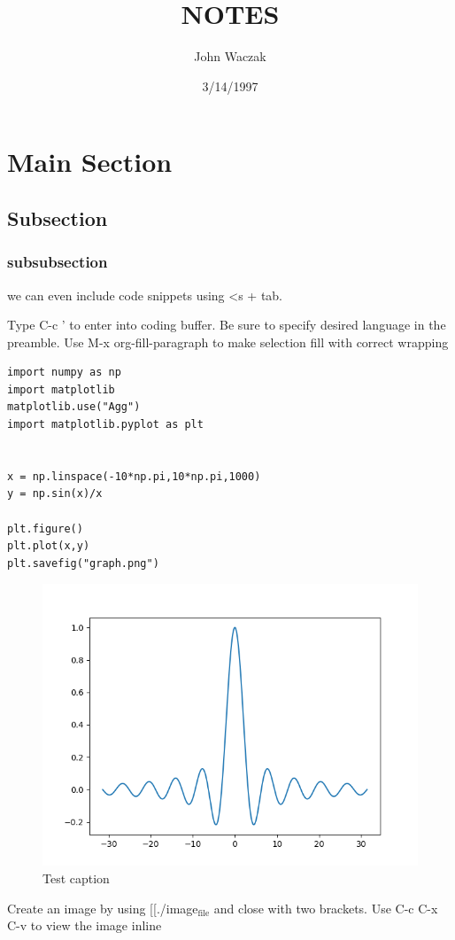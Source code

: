 \documentclass[11pt]{article}
\author{John Waczak}
\date{3/14/1997}
\title{NOTES}
\begin{document}
\maketitle

\section{Main Section}
\label{sec-1}

\subsection{Subsection}
\label{sec-1-1}

\subsubsection{subsubsection}
\label{sec-1-1-1}
we can even include code snippets using <s + tab.

Type C-c ' to enter into coding buffer. Be sure to specify desired
language in the preamble. Use M-x org-fill-paragraph to make
selection fill with correct wrapping
\begin{verbatim}
import numpy as np
import matplotlib
matplotlib.use("Agg")
import matplotlib.pyplot as plt


x = np.linspace(-10*np.pi,10*np.pi,1000)
y = np.sin(x)/x

plt.figure()
plt.plot(x,y)
plt.savefig("graph.png")
\end{verbatim}

\begin{figure}[htb]
\centering
\includegraphics[width=.9\linewidth]{./graph.png}
\caption{\label{Test-figure}Test caption}
\end{figure}

Create an image by using [[./image$_{\text{file}}$ and close with two
brackets. Use C-c C-x C-v to view the image inline
\end{document}

